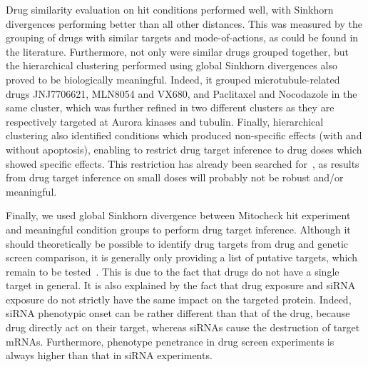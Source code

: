 Drug similarity evaluation on hit conditions performed well, with Sinkhorn divergences performing better than all other distances. This was measured by the grouping of drugs with similar targets and mode-of-actions, as could be found in the literature. Furthermore, not only were similar drugs grouped together, but the hierarchical clustering performed using global Sinkhorn divergences also proved to be biologically meaningful. Indeed, it grouped microtubule-related drugs JNJ7706621, MLN8054 and VX680, and Paclitaxel and Nocodazole in the same cluster, which was further refined in two different clusters as they are respectively targeted at Aurora kinases and tubulin. Finally, hierarchical clustering also identified conditions which produced non-specific effects (with and without apoptosis), enabling to restrict drug target inference to drug doses which showed specific effects. This restriction has already been searched for~\cite{pmid17401369}, as results from drug target inference on small doses will probably not be robust and/or meaningful.

Finally, we used global Sinkhorn divergence between Mitocheck hit experiment and meaningful condition groups to perform drug target inference. Although it should theoretically be possible to identify drug targets from drug and genetic screen comparison, it is generally only providing a list of putative targets, which remain to be tested~\cite{pmid23508189}. This is due to the fact that drugs do not have a single target in general. It is also explained by the fact that drug exposure and siRNA exposure do not strictly have the same impact on the targeted protein. Indeed, siRNA phenotypic onset can be rather different than that of the drug, because drug directly act on their target, whereas siRNAs cause the destruction of target mRNAs. Furthermore, phenotype penetrance in drug screen experiments is always higher than that in siRNA experiments.

